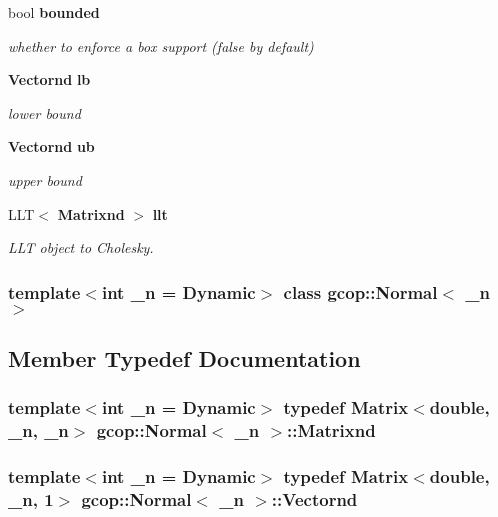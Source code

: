 \begin{DoxyCompactItemize}
bool {\bf bounded}
\begin{DoxyCompactList}\small\item\em whether to enforce a box support (false by default) \end{DoxyCompactList}\item 
{\bf \-Vectornd} {\bf lb}
\begin{DoxyCompactList}\small\item\em lower bound \end{DoxyCompactList}\item 
{\bf \-Vectornd} {\bf ub}
\begin{DoxyCompactList}\small\item\em upper bound \end{DoxyCompactList}\item 
\-L\-L\-T$<$ {\bf \-Matrixnd} $>$ {\bf llt}
\begin{DoxyCompactList}\small\item\em \-L\-L\-T object to \-Cholesky. \end{DoxyCompactList}\end{DoxyCompactItemize}
\subsubsection*{template$<$int \-\_\-n = \-Dynamic$>$ class gcop\-::\-Normal$<$ \-\_\-n $>$}



\subsection{\-Member \-Typedef \-Documentation}
\subsubsection[{\-Matrixnd}]{\setlength{\rightskip}{0pt plus 5cm}template$<$int \-\_\-n = \-Dynamic$>$ typedef \-Matrix$<$double, \-\_\-n, \-\_\-n$>$ {\bf gcop\-::\-Normal}$<$ \-\_\-n $>$\-::{\bf \-Matrixnd}}\label{classgcop_1_1Normal_a31cbf7be84f48a931e7a544274035d99}
\subsubsection[{\-Vectornd}]{\setlength{\rightskip}{0pt plus 5cm}template$<$int \-\_\-n = \-Dynamic$>$ typedef \-Matrix$<$double, \-\_\-n, 1$>$ {\bf gcop\-::\-Normal}$<$ \-\_\-n $>$\-::{\bf \-Vectornd}}\label{classgcop_1_1Normal_a112a22e65df0ccc800d10df1ecc7ffc3}


